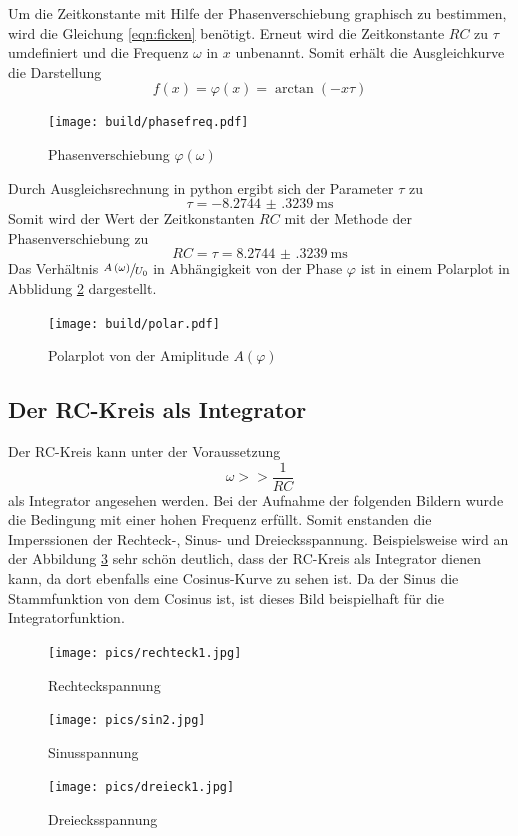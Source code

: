 Um die Zeitkonstante mit Hilfe der Phasenverschiebung graphisch zu bestimmen, wird die Gleichung \eqref{eqn:ficken} benötigt.
Erneut wird die Zeitkonstante $RC$ zu $\tau$ umdefiniert und die Frequenz $\omega$ in $x$ unbenannt.
Somit erhält die Ausgleichkurve die Darstellung 
\begin{equation}
    f \left( x \right) = \varphi \left ( x \right ) = \arctan \left( - x \tau \right)
\end{equation}
\begin{figure}
    \centering
    \caption{Phasenverschiebung $\varphi \left ( \omega \right )$}
    \label{fig:phiw}
    \texttt{[image: build/phasefreq.pdf]}
\end{figure}
Durch Ausgleichsrechnung in python ergibt sich der Parameter $\tau$ zu 
\begin{equation*}
    \tau = \SI{-8.2744(3239)}{\milli\second}
\end{equation*}
Somit wird der Wert der Zeitkonstanten $RC$ mit der Methode der Phasenverschiebung zu
\begin{equation*}
    RC =     \tau = \SI{8.2744(3239)}{\milli\second}
\end{equation*}
Das Verhältnis $\sfrac{A \left ( \omega \right )}{U_0}$ in Abhängigkeit von der Phase $\varphi$ ist in einem Polarplot in Abblidung \ref{fig:polar} dargestellt.
\begin{figure}
    \centering
    \caption{Polarplot von der Amiplitude $A \left( \varphi \right)$}
    \label{fig:polar}
    \texttt{[image: build/polar.pdf]}
\end{figure}
\newpage
\subsection{Der RC-Kreis als Integrator}
Der RC-Kreis kann unter der Voraussetzung 
\begin{equation}
     \omega >> \frac{1}{RC} 
\end{equation}
als Integrator angesehen  werden.
Bei der Aufnahme der folgenden Bildern wurde die Bedingung mit einer hohen Frequenz erfüllt.
Somit enstanden die Imperssionen der Rechteck-, Sinus- und Dreiecksspannung.
Beispielsweise wird an der Abbildung \ref{fig:sin} sehr schön deutlich, dass der RC-Kreis als Integrator dienen kann, da dort ebenfalls eine Cosinus-Kurve 
zu sehen ist. Da der Sinus die Stammfunktion von dem Cosinus ist, ist dieses Bild beispielhaft für die Integratorfunktion.
\begin{figure}
        \centering
        \caption{Rechteckspannung}
        \texttt{[image: pics/rechteck1.jpg]}
\end{figure}
\begin{figure}
    \centering
    \caption{Sinusspannung}
    \label{fig:sin}
    \texttt{[image: pics/sin2.jpg]}
\end{figure}
\begin{figure}
    \centering
    \caption{Dreiecksspannung}
    \texttt{[image: pics/dreieck1.jpg]}
\end{figure}